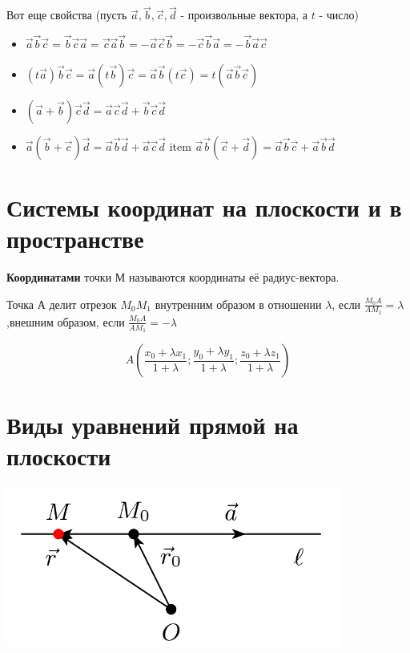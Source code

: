 \documentclass[a4paper]{article}
\begin{document}
{\begin{small}
Вот еще свойства (пусть $\vec{a}, \vec{b}, \vec{c}, \vec{d}$ - произвольные вектора, а $t$ - число)
\begin{itemize}
\item $\vec{a} \vec{b} \vec{c} = \vec{b} \vec{c} \vec{a} = \vec{c} \vec{a} \vec{b} = -\vec{a} \vec{c} \vec{b} = -\vec{c} \vec{b} \vec{a} = -\vec{b} \vec{a} \vec{c}$
\item $(t\vec{a}) \vec{b} \vec{c} = \vec{a} (t \vec{b}) \vec{c} = \vec{a} \vec{b} (t \vec{c}) = t (\vec{a} \vec{b} \vec{c})$
\item $(\vec{a} + \vec{b}) \vec{c} \vec{d} = \vec{a} \vec{c} \vec{d} + \vec{b} \vec{c} \vec{d} $
\item $\vec{a} (\vec{b} + \vec{c}) \vec{d} = \vec{a} \vec{b} \vec{d} + \vec{a} \vec{c} \vec{d}$
item $\vec{a} \vec{b} (\vec{c} + \vec{d}) = \vec{a} \vec{b} \vec{c} + \vec{a} \vec{b} \vec{d}$
\end{itemize}


\section*{Системы координат на плоскости и в пространстве}
\textbf{Координатами} точки М называются координаты её радиус-вектора.

Точка А делит отрезок $M_0 M_1$ внутренним образом в отношении $\lambda$, если $\displaystyle \frac{M_0 A}{A M_1} = \lambda$,\newline внешним образом, если $\displaystyle \frac{M_0 A}{A M_1} = -\lambda$

\begin{equation}
\displaystyle A \left( \frac{x_0 + \lambda x_1}{1 + \lambda}; \frac{y_0 + \lambda y_1}{1 + \lambda}; \frac{z_0 + \lambda z_1}{1+\lambda}\right)
\end{equation}



\section*{Виды уравнений прямой на плоскости}

\includegraphics[width=11cm]{t6}


\end{small}}
\end{document}
